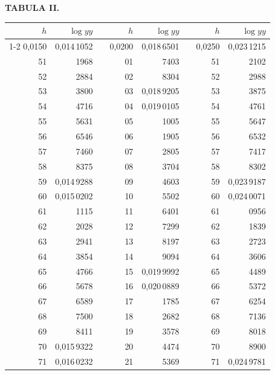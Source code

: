 \endgroup
{}
\clearpage
{}
\begingroup
\centering
\fontsize{9}{9}\selectfont
\setlength{\tabcolsep}{8pt}
\renewcommand{\arraystretch}{1}
\setlength{\parskip}{0pt}
\textbf{TABULA II.}
\par\vspace{7pt}
\begin{tabular}{|r|r|@{}p{9pt}@{}|r|r|@{}p{9pt}@{}|r|r|}
\hline
\(h\) & \(\log yy\) & & \(h\) & \(\log yy\) & & \(h\) & \(\log yy\) \\
\cline{1-2}\cline{4-5}\cline{7-8}
0,0150 & 0,014\,1052 &  & 0,0200 & 0,018\,6501 &  & 0,0250 & 0,023\,1215 \\
51 & 1968 &  & 01 & 7403 &  & 51 & 2102 \\
52 & 2884 &  & 02 & 8304 &  & 52 & 2988 \\
53 & 3800 &  & 03 & 0,018\,9205 &  & 53 & 3875 \\
54 & 4716 &  & 04 & 0,019\,0105 &  & 54 & 4761 \\
55 & 5631 &  & 05 & 1005 &  & 55 & 5647 \\[3pt]
56 & 6546 &  & 06 & 1905 &  & 56 & 6532 \\
57 & 7460 &  & 07 & 2805 &  & 57 & 7417 \\
58 & 8375 &  & 08 & 3704 &  & 58 & 8302 \\
59 & 0,014\,9288 &  & 09 & 4603 &  & 59 & 0,023\,9187 \\
60 & 0,015\,0202 &  & 10 & 5502 &  & 60 & 0,024\,0071 \\[3pt]
61 & 1115 &  & 11 & 6401 &  & 61 & 0956 \\
62 & 2028 &  & 12 & 7299 &  & 62 & 1839 \\
63 & 2941 &  & 13 & 8197 &  & 63 & 2723 \\
64 & 3854 &  & 14 & 9094 &  & 64 & 3606 \\
65 & 4766 &  & 15 & 0,019\,9992 &  & 65 & 4489 \\[3pt]
66 & 5678 &  & 16 & 0,020\,0889 &  & 66 & 5372 \\
67 & 6589 &  & 17 & 1785 &  & 67 & 6254 \\
68 & 7500 &  & 18 & 2682 &  & 68 & 7136 \\
69 & 8411 &  & 19 & 3578 &  & 69 & 8018 \\
70 & 0,015\,9322 &  & 20 & 4474 &  & 70 & 8900 \\[3pt]
71 & 0,016\,0232 &  & 21 & 5369 &  & 71 & 0,024\,9781 \\

\end{tabular}
